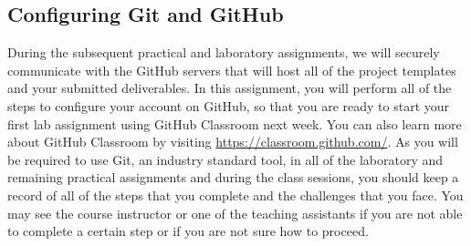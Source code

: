 \vspace*{-.2in}
\subsection*{Configuring Git and GitHub}
\vspace*{-.1in}

During the subsequent practical and  laboratory assignments, we will securely communicate
with the GitHub servers that will host all of the project templates and your submitted deliverables. In this assignment,
you will perform all of the steps to configure your account on GitHub, so that you are ready to start your first lab assignment using
GitHub Classroom next week.  You can
also learn more about GitHub Classroom by visiting \url{https://classroom.github.com/}. As you will be required to use
Git, an industry standard tool, in all of the  laboratory and remaining practical assignments and during the class
sessions, you should keep a record of all of the steps that you complete and the challenges that you face. You may see
the course instructor or one of the teaching assistants if you are not able to complete a certain step or if you are not
sure how to proceed.

